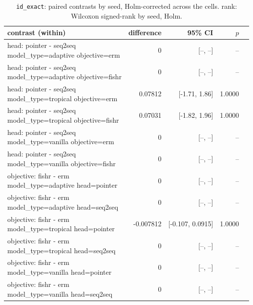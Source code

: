 \documentclass[10pt]{article}
\begin{document}
{\small
\begin{longtable}{lrrrl}
\caption{\texttt{id\_exact}: paired contrasts by seed, Holm-corrected across the cells. rank: Wilcoxon signed-rank by seed, Holm.}\label{tab:paired-id_exact}\\
\toprule
contrast (within) & difference & 95\% CI & $p$ & \\
\midrule
\endhead
\makecell[l]{head: pointer - seq2seq\\\footnotesize model\_type=adaptive objective=erm } & 0 & [--, --] & -- & \\
\makecell[l]{head: pointer - seq2seq\\\footnotesize model\_type=adaptive objective=fishr } & 0 & [--, --] & -- & \\
\makecell[l]{head: pointer - seq2seq\\\footnotesize model\_type=tropical objective=erm } & 0.07812 & [-1.71, 1.86] & 1.0000 & \\
\makecell[l]{head: pointer - seq2seq\\\footnotesize model\_type=tropical objective=fishr } & 0.07031 & [-1.82, 1.96] & 1.0000 & \\
\makecell[l]{head: pointer - seq2seq\\\footnotesize model\_type=vanilla objective=erm } & 0 & [--, --] & -- & \\
\makecell[l]{head: pointer - seq2seq\\\footnotesize model\_type=vanilla objective=fishr } & 0 & [--, --] & -- & \\
\makecell[l]{objective: fishr - erm\\\footnotesize model\_type=adaptive head=pointer } & 0 & [--, --] & -- & \\
\makecell[l]{objective: fishr - erm\\\footnotesize model\_type=adaptive head=seq2seq } & 0 & [--, --] & -- & \\
\makecell[l]{objective: fishr - erm\\\footnotesize model\_type=tropical head=pointer } & -0.007812 & [-0.107, 0.0915] & 1.0000 & \\
\makecell[l]{objective: fishr - erm\\\footnotesize model\_type=tropical head=seq2seq } & 0 & [--, --] & -- & \\
\makecell[l]{objective: fishr - erm\\\footnotesize model\_type=vanilla head=pointer } & 0 & [--, --] & -- & \\
\makecell[l]{objective: fishr - erm\\\footnotesize model\_type=vanilla head=seq2seq } & 0 & [--, --] & -- & \\
\bottomrule
\end{longtable}
}
\end{document}
